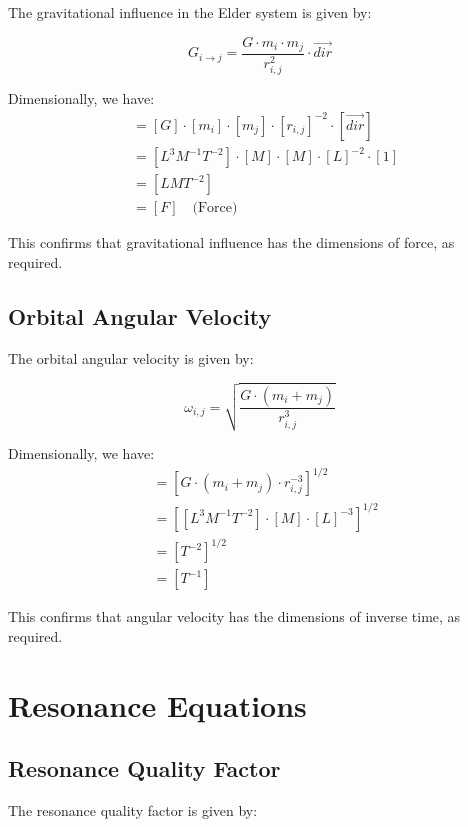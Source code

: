 The gravitational influence in the Elder system is given by:

\begin{equation}
G_{i \rightarrow j} = \frac{G \cdot m_i \cdot m_j}{r_{i,j}^2} \cdot \vec{dir}
\end{equation}

Dimensionally, we have:
\begin{align}
[G_{i \rightarrow j}] &= [G] \cdot [m_i] \cdot [m_j] \cdot [r_{i,j}]^{-2} \cdot [\vec{dir}] \\
&= [L^3 M^{-1} T^{-2}] \cdot [M] \cdot [M] \cdot [L]^{-2} \cdot [1] \\
&= [L M T^{-2}] \\
&= [F] \quad \text{(Force)}
\end{align}

This confirms that gravitational influence has the dimensions of force, as required.

\subsection{Orbital Angular Velocity}

The orbital angular velocity is given by:

\begin{equation}
\omega_{i,j} = \sqrt{\frac{G \cdot (m_i + m_j)}{r_{i,j}^3}}
\end{equation}

Dimensionally, we have:
\begin{align}
[\omega_{i,j}] &= \left[G \cdot (m_i + m_j) \cdot r_{i,j}^{-3}\right]^{1/2} \\
&= \left[[L^3 M^{-1} T^{-2}] \cdot [M] \cdot [L]^{-3}\right]^{1/2} \\
&= \left[T^{-2}\right]^{1/2} \\
&= [T^{-1}]
\end{align}

This confirms that angular velocity has the dimensions of inverse time, as required.

\section{Resonance Equations}

\subsection{Resonance Quality Factor}

The resonance quality factor is given by:

